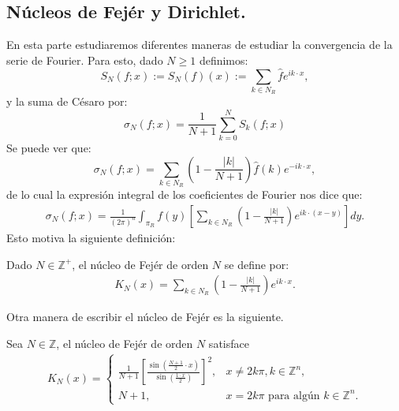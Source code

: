   \subsection{Núcleos de Fejér y Dirichlet.}
    En esta parte estudiaremos diferentes maneras de estudiar la convergencia de la serie de Fourier. Para esto, dado $N\geq 1$ definimos:
    \begin{equation}
      S_{N}(f;x):=S_{N}(f)(x):=\sum_{k\in N_R}\hat{f}e^{ik\cdot x},\label{eq:serie_parcial}  
    \end{equation}
    y la suma de Césaro por:
    \begin{equation}
      \sigma_{N}(f;x)={\frac{1}{N+1}}\sum_{k=0}^{N}S_{k}(f;x)\label{eq:suma-de-cesaro}  
    \end{equation}
    Se puede ver que:
    \begin{equation}
      \sigma_{N}(f;x)=\sum_{k\in N_R}\left( 1-\frac{|k|}{N+1} \right)\hat{f}(k)e^{-ik\cdot x},\label{eq:2-21} 
    \end{equation}
    de lo cual la expresión integral de los coeficientes de Fourier nos dice que:
    \begin{align*}
      \sigma_{N}(f;x)=\frac{1}{(2\pi)^n}\int_{\pi_R}f(y)\left[ \sum_{k\in N_R}\left( 1-\frac{|k|}{N+1} \right)e^{ik\cdot (x-y)} \right]dy.
    \end{align*}
    Esto motiva la siguiente definición:
    \begin{definition}
      Dado $N\in\mathbb{Z}^{+}$, el núcleo de Fejér de orden $N$ se define por:
      \begin{align*}
        K_{N}(x)=\sum_{k\in N_R}\left( 1-\frac{|k|}{N+1} \right)e^{ik\cdot x}.
      \end{align*}
    \end{definition}
    Otra manera de escribir el núcleo de Fejér es la siguiente.
    \begin{proposition}
      Sea $N \in \mathbb{Z}$, el núcleo de Fejér de orden $N$ satisface
      \begin{align*}
        K_N(x) = \begin{cases}
          \frac{1}{N+1} \left[ \frac{\sin \left( \frac{N+1}{2}\cdot x \right)}{\sin \left( \frac{1\cdot x}{2} \right)} \right]^2, & x\neq 2k\pi, k\in \mathbb{Z}^{n}, \\
          N+1, & x = 2k\pi \text{ para algún } k \in \mathbb{Z}^{n}.
        \end{cases}
      \end{align*}
    \end{proposition}
